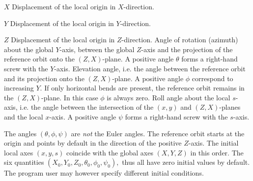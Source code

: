 \begin{mylist}
\item[$X$]
Displacement of the local origin in $X$-direction.
\item[$Y$]
Displacement of the local origin in $Y$-direction.
\item[$Z$]
Displacement of the local origin in $Z$-direction.
\keyitem{$\theta$}
Angle of rotation (azimuth) about the global $Y$-axis,
between the global $Z$-axis and the projection
of the reference orbit onto the $(Z, X)$-plane.
A positive angle $\theta$ forms a right-hand screw with the
$Y$-axis.
\keyitem{$\phi$}
Elevation angle,
i.e. the angle between the reference orbit and its projection
onto the $(Z, X)$-plane.
A positive angle $\phi$ correspond to increasing $Y$.
If only horizontal bends are present,
the reference orbit remains in the $(Z, X)$-plane.
In this case $\phi$ is always zero.
\keyitem{$\psi$}
Roll angle about the local $s$-axis,
i.e. the angle between the intersection
of the $(x, y)$ and $(Z, X)$-planes and the local $x$-axis.
A positive angle $\psi$ forms a right-hand screw with the $s$-axis.
\end{mylist}
The angles $(\theta, \phi, \psi)$ are {\it not} the Euler angles.
The reference orbit starts at the origin and points by default
in the direction of the positive $Z$-axis.
The initial local axes $(x, y, s)$ coincide with the global axes
$(X, Y, Z)$ in this order.
The six quantities
$(X_{0}, Y_{0}, Z_{0}, \theta_{0}, \phi_{0}, \psi_{0}),$
thus all have zero initial values by default.
The program user may however specify different initial conditions.

